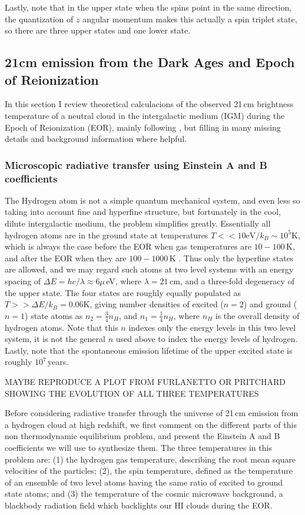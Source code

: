 Lastly, note that in the upper state when the spins point in the same direction, the quantization of $z$ angular momentum makes this actually a spin triplet state, so there are three upper states and one lower state.

\subsection{21cm emission from the Dark Ages and Epoch of Reionization}

In this section I review theoretical calculacions of the observed 21\,cm brightness temperature of a neutral cloud in the intergalactic medium (IGM) during the Epoch of Reionization (EOR), mainly following \citet{PritchardLoebReview}, but filling in many missing details and background information where helpful. 

\subsubsection{Microscopic radiative transfer using Einstein A and B coefficients}

The Hydrogen atom is not a simple quantum mechanical system, and even less so taking into account fine and hyperfine structure, but fortunately in the cool, dilute intergalactic medium, the problem simplifies greatly. Essentially all hydrogen atoms are in the ground state at temperatures  $T<<10\text{eV}/k_B\sim10^5$K, which is always the case before the EOR when gas temperatures are $10-100$\,K, and after the EOR when they are $100-1000$\,K \citep{FurlanettoReview}. Thus only the hyperfine states are allowed, and we may regard such atoms at two level systems with an energy spacing of $\Delta E=hc/\lambda\approx6\mu$\,eV, where $\lambda=21$\,cm, and a three-fold degeneracy of the upper state. The four states are roughly equally populated as $T>>\Delta E/k_B =0.06$K, giving number densities of excited ($n=2$) and ground ($n=1$) state atoms as $n_2=\frac{3}{4}n_H$, and $n_1=\frac{1}{4}n_H$, where $n_H$ is the overall density of hydrogen atoms. Note that this $n$ indexes only the energy levels in this two level system, it is not the general $n$ used above to index the energy levels of hydrogen. Lastly, note that the spontaneous emission lifetime of the upper excited state is roughly $10^7$\,years.


MAYBE REPRODUCE A PLOT FROM FURLANETTO OR PRITCHARD SHOWING THE EVOLUTION OF ALL THREE TEMPERATURES

Before considering radiative transfer through the universe of 21\,cm emission from a hydrogen cloud at high redshift, we first comment on the different parts of this non thermodynamic equilibrium problem, and present the Einstein A and B coefficients we will use to synthesize them. The three temperatures in this problem are: (1) the hydrogen gas temperature, describing the root mean square velocities of the particles; (2), the spin temperature, defined as the temperature of an ensemble of two level atoms having the same ratio of excited to ground state atoms; and (3) the temperature of the cosmic microwave background, a blackbody radiation field which backlights our HI clouds during the EOR. 

